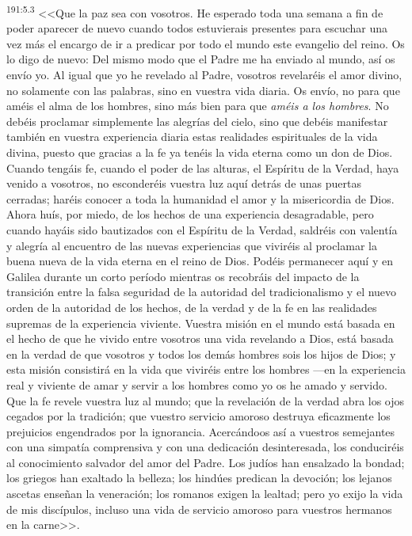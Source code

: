 \par 
\textsuperscript{191:5.3} <<Que la paz sea con vosotros. He esperado toda una semana a fin de poder aparecer de nuevo cuando todos estuvierais presentes para escuchar una vez más el encargo de ir a predicar por todo el mundo este evangelio del reino. Os lo digo de nuevo: Del mismo modo que el Padre me ha enviado al mundo, así os envío yo. Al igual que yo he revelado al Padre, vosotros revelaréis el amor divino, no solamente con las palabras, sino en vuestra vida diaria. Os envío, no para que améis el alma de los hombres, sino más bien para que \textit{améis a los hombres}. No debéis proclamar simplemente las alegrías del cielo, sino que debéis manifestar también en vuestra experiencia diaria estas realidades espirituales de la vida divina, puesto que gracias a la fe ya tenéis la vida eterna como un don de Dios. Cuando tengáis fe, cuando el poder de las alturas, el Espíritu de la Verdad, haya venido a vosotros, no esconderéis vuestra luz aquí detrás de unas puertas cerradas; haréis conocer a toda la humanidad el amor y la misericordia de Dios. Ahora huís, por miedo, de los hechos de una experiencia desagradable, pero cuando hayáis sido bautizados con el Espíritu de la Verdad, saldréis con valentía y alegría al encuentro de las nuevas experiencias que viviréis al proclamar la buena nueva de la vida eterna en el reino de Dios. Podéis permanecer aquí y en Galilea durante un corto período mientras os recobráis del impacto de la transición entre la falsa seguridad de la autoridad del tradicionalismo y el nuevo orden de la autoridad de los hechos, de la verdad y de la fe en las realidades supremas de la experiencia viviente. Vuestra misión en el mundo está basada en el hecho de que he vivido entre vosotros una vida revelando a Dios, está basada en la verdad de que vosotros y todos los demás hombres sois los hijos de Dios; y esta misión consistirá en la vida que viviréis entre los hombres ---en la experiencia real y viviente de amar y servir a los hombres como yo os he amado y servido. Que la fe revele vuestra luz al mundo; que la revelación de la verdad abra los ojos cegados por la tradición; que vuestro servicio amoroso destruya eficazmente los prejuicios engendrados por la ignorancia. Acercándoos así a vuestros semejantes con una simpatía comprensiva y con una dedicación desinteresada, los conduciréis al conocimiento salvador del amor del Padre. Los judíos han ensalzado la bondad; los griegos han exaltado la belleza; los hindúes predican la devoción; los lejanos ascetas enseñan la veneración; los romanos exigen la lealtad; pero yo exijo la vida de mis discípulos, incluso una vida de servicio amoroso para vuestros hermanos en la carne>>.


